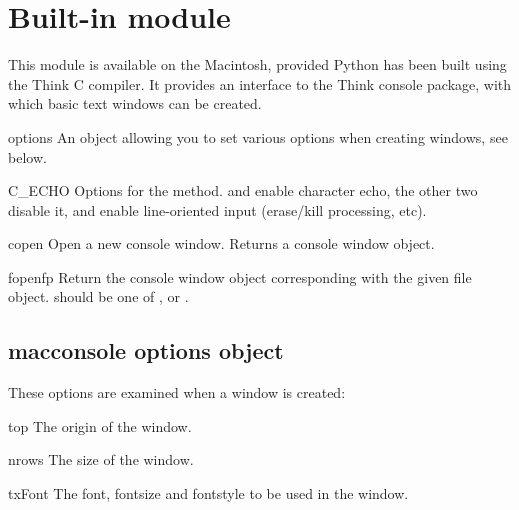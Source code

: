 \section{Built-in module }

This module is available on the Macintosh, provided Python has been
built using the Think C compiler. It provides an interface to the
Think console package, with which basic text windows can be created.

\begin{datadesc}{options}
An object allowing you to set various options when creating windows,
see below.
\end{datadesc}

\begin{datadesc}{C_ECHO}
Options for the  method.  and 
enable character echo, the other two disable it,  and
 enable line-oriented input (erase/kill processing,
etc).
\end{datadesc}

\begin{funcdesc}{copen}{}
Open a new console window. Returns a console window object.
\end{funcdesc}

\begin{funcdesc}{fopen}{fp}
Return the console window object corresponding with the given file
object.  should be one of ,  or
.
\end{funcdesc}

\subsection{macconsole options object}
These options are examined when a window is created:

\renewcommand{\indexsubitem}{(macconsole option)}
\begin{datadesc}{top}
The origin of the window.
\end{datadesc}

\begin{datadesc}{nrows}
The size of the window.
\end{datadesc}

\begin{datadesc}{txFont}
The font, fontsize and fontstyle to be used in the window.
\end{datadesc}

